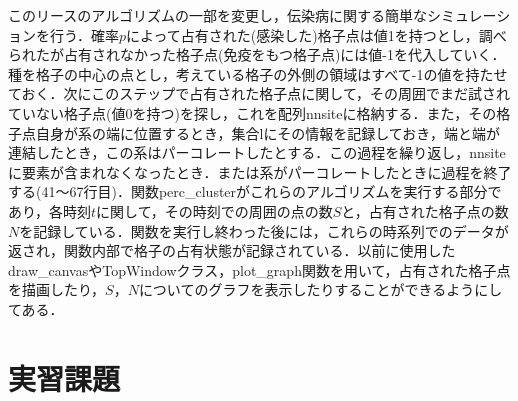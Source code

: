 \documentclass{jsarticle}
\begin{document}
            このリースのアルゴリズムの一部を変更し，伝染病に関する簡単なシミュレーションを行う．確率$p$によって占有された(感染した)格子点は値1を持つとし，調べられたが占有されなかった格子点(免疫をもつ格子点)には値-1を代入していく．種を格子の中心の点とし，考えている格子の外側の領域はすべて-1の値を持たせておく．次にこのステップで占有された格子点に関して，その周囲でまだ試されていない格子点(値0を持つ)を探し，これを配列nnsiteに格納する．また，その格子点自身が系の端に位置するとき，集合lにその情報を記録しておき，端と端が連結したとき，この系はパーコレートしたとする．この過程を繰り返し，nnsiteに要素が含まれなくなったとき．または系がパーコレートしたときに過程を終了する(41〜67行目)．関数perc\_clusterがこれらのアルゴリズムを実行する部分であり，各時刻$t$に関して，その時刻での周囲の点の数$S$と，占有された格子点の数$N$を記録している．関数を実行し終わった後には，これらの時系列でのデータが返され，関数内部で格子の占有状態が記録されている．以前に使用したdraw\_canvasやTopWindowクラス，plot\_graph関数を用いて，占有された格子点を描画したり，$S$，$N$についてのグラフを表示したりすることができるようにしてある．
            
            
            
    \section{実習課題}
    
\end{document}
